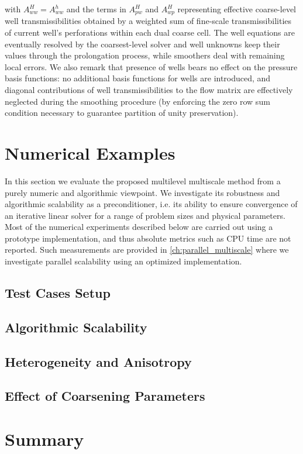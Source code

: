 with $A_{ww}^H = A_{ww}^h$ and the terms in $A_{pw}^H$ and $A_{wp}^H$ representing effective coarse-level well transmissibilities obtained by a weighted sum of fine-scale transmissibilities of current well's perforations within each dual coarse cell.   The well equations are eventually resolved by the coarsest-level solver and well unknowns keep their values through the prolongation process, while smoothers deal with remaining local errors.   We also remark that presence of wells bears no effect on the pressure basis functions: no additional basis functions for wells are introduced, and diagonal contributions of well transmissibilities to the flow matrix are effectively neglected during the smoothing procedure (by enforcing the zero row sum condition necessary to guarantee partition of unity preservation).

\section{Numerical Examples}
\label{sec:msrsb_examples}

In this section we evaluate the proposed multilevel multiscale method from a purely numeric and algorithmic viewpoint.   We investigate its robustness and algorithmic scalability as a preconditioner, i.e. its ability to ensure convergence of an iterative linear solver for a range of problem sizes and physical parameters.   Most of the numerical experiments described below are carried out using a prototype implementation, and thus absolute metrics such as CPU time are not reported.   Such measurements are provided in \autoref{ch:parallel_multiscale} where we investigate parallel scalability using an optimized implementation.

\subsection{Test Cases Setup}

\subsection{Algorithmic Scalability}

\subsection{Heterogeneity and Anisotropy}

\subsection{Effect of Coarsening Parameters}

\section{Summary}
\label{sec:msrsb_summary}